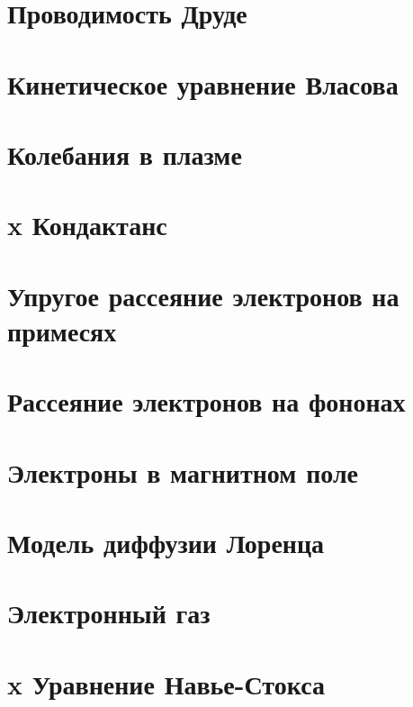 



\section*{Проводимость Друде}


\section{Кинетическое уравнение Власова}


\section{Колебания в плазме}


\section{x Кондактанс}


\section{Упругое рассеяние электронов на примесях}


\section{Рассеяние электронов на фононах}


\section{Электроны в магнитном поле}


\section{Модель диффузии Лоренца}


\section{Электронный газ}


\section{x Уравнение Навье-Стокса}





